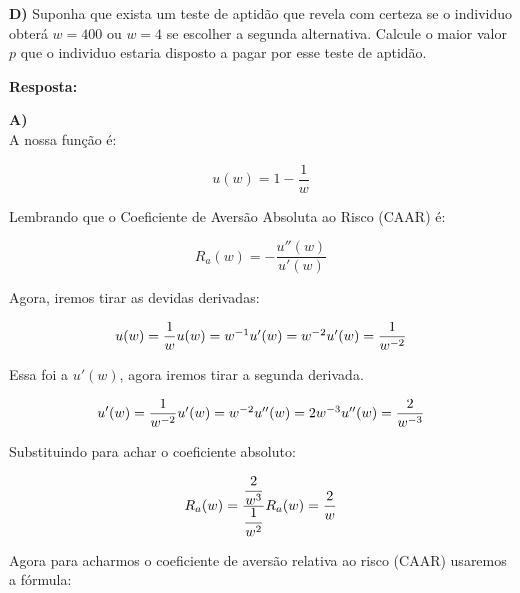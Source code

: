 \singlespacing

\textbf{D)} Suponha que exista um teste de aptidão que revela com certeza se o individuo obterá $w = 400$ ou $w = 4$ se escolher a segunda alternativa. Calcule o maior valor $p$ que o
individuo estaria disposto a pagar por esse teste de aptidão.

\singlespacing

\textbf{Resposta:} 

\singlespacing

\textbf{A)} 
\\
A nossa função é:

\begin{equation}
	u(w) = 1 - \dfrac{1}{w}
\end{equation}

Lembrando que o Coeficiente de Aversão Absoluta ao Risco (CAAR) é:

\begin{equation}
	R_{a}(w) = - \dfrac{u''(w)}{u'(w)}
\end{equation}

Agora, iremos tirar as devidas derivadas:

\begin{equation}
	u(w) = \dfrac{1}{w}
	$$\\$$
	u(w) = w^{-1}
	$$\\$$
	u'(w) = w^{-2}
	$$\\$$
	u'(w) = \dfrac{1}{w^{-2}}
\end{equation}

Essa foi a $u'(w)$, agora iremos tirar a segunda derivada.

\begin{equation}
	u'(w) = \dfrac{1}{w^{-2}}
	$$\\$$
	u'(w) = w^{-2}
	$$\\$$
	u''(w) = 2w^{-3}
	$$\\$$
	u''(w) = \dfrac{2}{w^{-3}}
\end{equation}

Substituindo para achar o coeficiente absoluto:

\begin{equation}
	R_{a}(w) = \dfrac{\dfrac{2}{w^{3}}}{\dfrac{1}{w^{2}}}
	$$\\$$
	R_{a}(w) = \dfrac{2}{w}
	$$\\$$
\end{equation}

Agora para acharmos o coeficiente de aversão relativa ao risco (CAAR) usaremos a fórmula:

